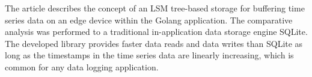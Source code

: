 The article describes the concept of an LSM tree-based storage for buffering time series data on an edge device within the Golang application. The comparative analysis was performed to a traditional in-application data storage engine SQLite. The developed library provides faster data reads and data writes than SQLite as long as the timestamps in the time series data are linearly increasing, which is common for any data logging application.
